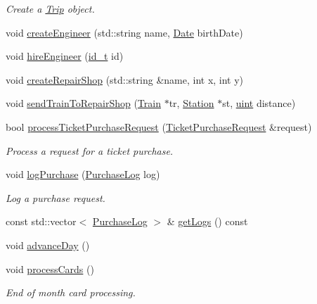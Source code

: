 \begin{DoxyCompactItemize}
\begin{DoxyCompactList}\small\item\em Create a \mbox{\hyperlink{classTrip}{Trip}} object. \end{DoxyCompactList}\item 
void \mbox{\hyperlink{classSystem_ae08e68de517d1a18828c55ff3fab2cc9}{create\+Engineer}} (std\+::string name, \mbox{\hyperlink{classDate}{Date}} birth\+Date)
\item 
void \mbox{\hyperlink{classSystem_a9d679f887ea7cd8bb34d84bd8ffd605b}{hire\+Engineer}} (\mbox{\hyperlink{project__utils_8h_a8f3a969054ad2200720b96e7e23dd4e1}{id\+\_\+t}} id)
\item 
void \mbox{\hyperlink{classSystem_a9a71a2cf8064bb20d4235b5aecb927f4}{create\+Repair\+Shop}} (std\+::string \&name, int x, int y)
\item 
void \mbox{\hyperlink{classSystem_a141f8056dd552acd8c535cc46aeba878}{send\+Train\+To\+Repair\+Shop}} (\mbox{\hyperlink{classTrain}{Train}} $\ast$tr, \mbox{\hyperlink{classStation}{Station}} $\ast$st, \mbox{\hyperlink{project__utils_8h_a91ad9478d81a7aaf2593e8d9c3d06a14}{uint}} distance)
\item 
bool \mbox{\hyperlink{classSystem_ac2b6f3d934b64f4fa56ffb1db1d261df}{process\+Ticket\+Purchase\+Request}} (\mbox{\hyperlink{classTicketPurchaseRequest}{Ticket\+Purchase\+Request}} \&request)
\begin{DoxyCompactList}\small\item\em Process a request for a ticket purchase. \end{DoxyCompactList}\item 
void \mbox{\hyperlink{classSystem_a3d823d755bcbc5843dd261b88693bc69}{log\+Purchase}} (\mbox{\hyperlink{classPurchaseLog}{Purchase\+Log}} log)
\begin{DoxyCompactList}\small\item\em Log a purchase request. \end{DoxyCompactList}\item 
const std\+::vector$<$ \mbox{\hyperlink{classPurchaseLog}{Purchase\+Log}} $>$ \& \mbox{\hyperlink{classSystem_af8aa6900656b6e81c7f13db29782baa4}{get\+Logs}} () const
\item 
void \mbox{\hyperlink{classSystem_a7e2c83b2b5749886087f9d5d86ad241b}{advance\+Day}} ()
\item 
void \mbox{\hyperlink{classSystem_aebffe11376f68cb17175f30ea517c10b}{process\+Cards}} ()
\begin{DoxyCompactList}\small\item\em End of month card processing. \end{DoxyCompactList}\item 

\end{DoxyCompactItemize}
